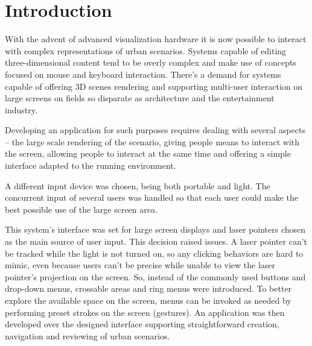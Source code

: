 \chapter{Introduction}






With the advent of advanced visualization hardware it is now possible
to interact with complex representations of urban scenarios.
Systems capable of editing three-dimensional content
tend to be overly complex and make use of concepts
focused on mouse and keyboard interaction.
There's a demand for systems capable of offering 3D scenes rendering
and supporting multi-user interaction on large screens on fields
so disparate as architecture and the entertainment industry.



Developing an application for such purposes requires dealing with several aspects
-- the large scale rendering of the scenario,
giving people means to interact with the screen,
allowing people to interact at the same time and
offering a simple interface adapted to the running environment.



A different input device was chosen, being both portable and light.
The concurrent input of several users was handled so that each user
could make the best possible use of the large screen area.

This system's interface was set for large screen displays and laser pointers chosen as the main source of user input.
This decision raised issues.
A laser pointer can't be tracked while the light is not turned on,
so any clicking behaviors are hard to mimic, even because users can't be 
precise while unable to view the laser pointer's projection on the screen.
So, instead of the commonly used buttons and drop-down menus,
crossable areas and ring menus were introduced.
To better explore the available space on the screen,
menus can be invoked as needed by performing preset strokes on the screen (gestures).
An application was then developed over the designed interface
supporting straightforward creation, navigation and reviewing of urban scenarios.


